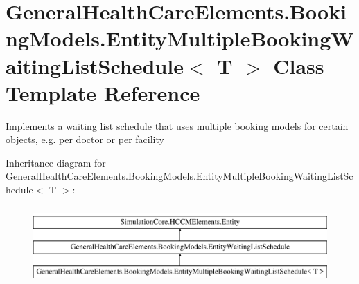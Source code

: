\hypertarget{class_general_health_care_elements_1_1_booking_models_1_1_entity_multiple_booking_waiting_list_schedule}{}\section{General\+Health\+Care\+Elements.\+Booking\+Models.\+Entity\+Multiple\+Booking\+Waiting\+List\+Schedule$<$ T $>$ Class Template Reference}
\label{class_general_health_care_elements_1_1_booking_models_1_1_entity_multiple_booking_waiting_list_schedule}


Implements a waiting list schedule that uses multiple booking models for certain objects, e.\+g. per doctor or per facility  


Inheritance diagram for General\+Health\+Care\+Elements.\+Booking\+Models.\+Entity\+Multiple\+Booking\+Waiting\+List\+Schedule$<$ T $>$\+:\begin{figure}[H]
\begin{center}
\leavevmode
\includegraphics[height=3.000000cm]{class_general_health_care_elements_1_1_booking_models_1_1_entity_multiple_booking_waiting_list_schedule}
\end{center}
\end{figure}
